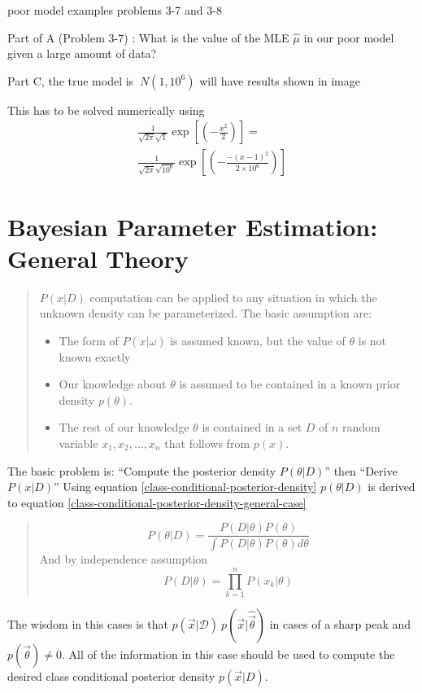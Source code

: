 \documentclass[11pt]{article}
\begin{document}
poor model examples problems 3-7 and 3-8  

Part of A (Problem 3-7) : What is the value of the MLE $\hat{\mu}$ in our poor model given a large amount of data?  


Part C, the true model is $~N(1, 10^6)$ will have results shown in image

This has to be solved numerically using 
\begin{eqnarray}
	\frac{1}{\sqrt{2\pi} \sqrt{1}} \exp [(-\frac{x^2}{2} )] = \\
	\frac{1}{\sqrt{2\pi}\sqrt{10^6}}\exp [(-\frac{-(x-1)^2}{2 \times 10^6} )] 
\end{eqnarray}


\section{Bayesian Parameter Estimation: General Theory}

\begin{quote}
	$P(x | D)$ computation can be applied to any situation in which the unknown density can be parameterized.  The basic assumption are: 
	\begin{itemize}
		\item The form of $P(x | \omega)$ is assumed known, but the value of $\theta$ is not known exactly 
		\item Our knowledge about $\theta$ is assumed to be contained in a known prior density $p(\theta)$.
		\item The rest of our knowledge $\theta$ is contained in a set $D$ of $n$ random variable $x_1, x_2,..., x_n$ that follows from $p(x)$.
	\end{itemize} \cite[97]{duda-hart-stork}
\end{quote}

The basic problem is: ``Compute the posterior density $P(\theta | D)$'' then ``Derive $P(x | D)$''
Using equation \ref{class-conditional-posterior-density} $p(\theta |D)$ is derived to equation \ref{class-conditional-posterior-density-general-case} %
\begin{quote}
	\begin{equation}
		P( \theta | D) = \frac{ P(D | \theta) P(\theta) } { \int P(D | \theta ) P( \theta) d \theta  } \label{class-conditional-posterior-density-general-case}
	\end{equation}
	And by independence assumption
	\begin{equation}
		P( D | \theta) = \prod _{k=1} ^n P( x_k | \theta)
	\end{equation}
	\cite[97]{duda-hart-stork}
\end{quote}
The wisdom in this cases is that $p(\vec{x} | \mathcal{D}) ~ p(\vec{x} | \hat{\vec{\theta}})$ in cases of a sharp peak and $p(\vec{\theta}) \neq 0$.  All of the information in this case should be used to compute the desired class conditional posterior density $p(\vec{x}| D)$.
\end{document}

